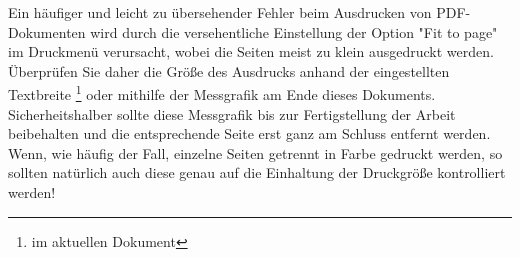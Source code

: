 Ein häufiger und leicht zu übersehender Fehler beim Ausdrucken von
PDF-Doku\-menten wird durch die versehentliche Einstellung der Option "Fit to
page" im Druckmenü verursacht, wobei die Seiten meist zu klein ausgedruckt
werden. Überprüfen Sie daher die Größe des Ausdrucks anhand der eingestellten
Textbreite%
\footnote{\Convert[unit=mm]{\the\textwidth}	im aktuellen Dokument} %
oder mithilfe der Messgrafik am Ende dieses Dokuments.
Sicherheitshalber sollte diese Messgrafik bis zur Fertigstellung der
Arbeit beibehalten und die entsprechende Seite erst ganz am Schluss
entfernt werden. Wenn, wie häufig der Fall, einzelne Seiten getrennt in Farbe
gedruckt werden, so sollten natürlich auch diese genau auf die Einhaltung der
Druckgröße kontrolliert werden!